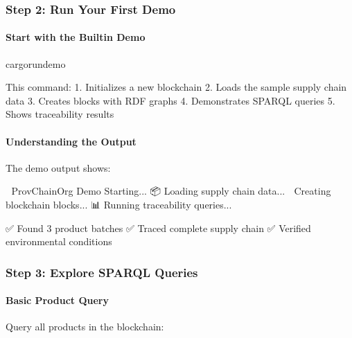 \documentclass[letterpaper,10pt,english]{sphinxmanual}
\begin{document}
\subsubsection{Step 2: Run Your First Demo}
\label{\detokenize{tutorials/first-supply-chain:step-2-run-your-first-demo}}

\paragraph{Start with the Built\sphinxhyphen{}in Demo}
\label{\detokenize{tutorials/first-supply-chain:start-with-the-built-in-demo}}
\begin{sphinxVerbatim}[commandchars=\\\{\}]
cargorundemo
\end{sphinxVerbatim}

\sphinxAtStartPar
This command:
1. Initializes a new blockchain
2. Loads the sample supply chain data
3. Creates blocks with RDF graphs
4. Demonstrates SPARQL queries
5. Shows traceability results


\paragraph{Understanding the Output}
\label{\detokenize{tutorials/first-supply-chain:understanding-the-output}}
\sphinxAtStartPar
The demo output shows:

\begin{sphinxVerbatim}[commandchars=\\\{\}]
🚀 ProvChainOrg Demo Starting...
📦 Loading supply chain data...
🔗 Creating blockchain blocks...
📊 Running traceability queries...

✅ Found 3 product batches
✅ Traced complete supply chain
✅ Verified environmental conditions
\end{sphinxVerbatim}


\subsubsection{Step 3: Explore SPARQL Queries}
\label{\detokenize{tutorials/first-supply-chain:step-3-explore-sparql-queries}}

\paragraph{Basic Product Query}
\label{\detokenize{tutorials/first-supply-chain:basic-product-query}}
\sphinxAtStartPar
Query all products in the blockchain:
\end{document}
